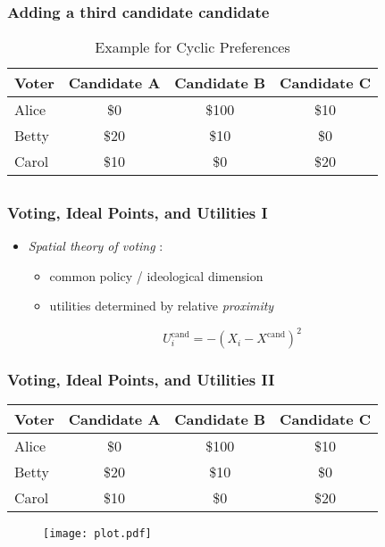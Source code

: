 \documentclass{beamer}
\begin{document}
\begin{frame}%
\frametitle{Adding a third candidate candidate}
\begin{table}[c]
  \caption{Example for Cyclic Preferences}
  \begin{center}
    \begin{tabular}{lccc}
    \hline
    \textbf{Voter} & \textbf{Candidate A} & \textbf{Candidate B} & \textbf{Candidate C} \\
    \hline
       Alice & \$0 & \$100 & \$10 \\
       Betty & \$20 & \$10 & \$0 \\
       Carol & \$10 & \$0 & \$20 \\
    \hline
    \end{tabular}
  \end{center}
\end{table}
\end{frame}

\subsection{}
\begin{frame}%
\frametitle{Voting, Ideal Points, and Utilities I}
\begin{itemize}
  \item \emph{Spatial theory of voting} \citep[e.g.][]{downs1957economic,westholm1997distance}:
  \begin{itemize}
     \item common policy / ideological dimension
     \item utilities determined by relative \emph{proximity}
   \end{itemize}
  \end{itemize}
  $$U_i^\text{cand} = -(X_i - X^\text{cand})^2$$
\end{frame}

\begin{frame}%
\frametitle{Voting, Ideal Points, and Utilities II}
\begin{table}[c]
  \caption{Example for Cyclic Preferences}
  \begin{center}
    \begin{tabular}{lccc}
    \hline
    \textbf{Voter} & \textbf{Candidate A} & \textbf{Candidate B} & \textbf{Candidate C} \\
    \hline
       Alice & \$0 & \$100 & \$10 \\
       Betty & \$20 & \$10 & \$0 \\
       Carol & \$10 & \$0 & \$20 \\
    \hline
    \end{tabular}
  \end{center}
  \begin{figure}[b]\centering
      \texttt{[image: plot.pdf]}
  \end{figure}
\end{table}
\end{frame}
\end{document}
